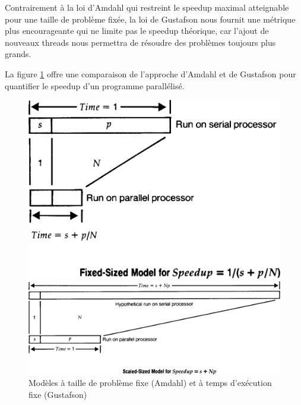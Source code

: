 \documentclass[a4paper, 10pt, twoside]{article}
\begin{document}
Contrairement à la loi d'Amdahl qui restreint le speedup maximal atteignable pour une taille de problème fixée, la loi de Gustafson nous fournit une métrique plus encourageante qui ne limite pas le speedup théorique, car l'ajout de nouveaux threads nous permettra de résoudre des problèmes toujours plus grands.


La figure \ref{fig:speedup-models} offre une comparaison de l'approche d'Amdahl et de Gustafson pour quantifier le speedup d'un programme parallélisé.

\begin{figure}[htb]
	\centering
	\begin{minipage}{0.33\textwidth}
		\centering
		\includegraphics[width=\textwidth]{img/amdahl_speedup_model.png}
	\end{minipage}
	\begin{minipage}{0.65\textwidth}
		\centering
		\includegraphics[width=\textwidth]{img/gustafson_speedup_model.png}
	\end{minipage}
	\caption{Modèles à taille de problème fixe (Amdahl) et à temps d'exécution fixe (Gustafson)}
	\label{fig:speedup-models}
\end{figure}
\end{document}
